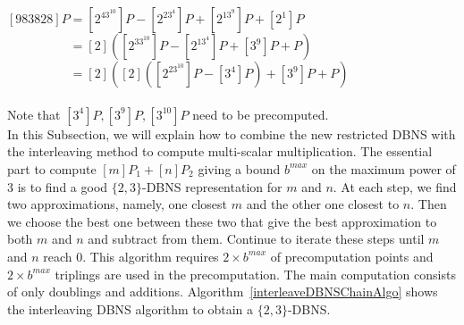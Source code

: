  \\
\\
$[983828]P = [2^43^{10}]P - [2^23^4]P + [2^13^9]P + [2^1]P$ \\
$\phantom{[983828]P} = [2]([2^33^{10}]P - [2^13^4]P + [3^9]P + P)$ \\
$\phantom{[983828]P} = [2]([2]([2^23^{10}]P - [3^4]P) + [3^9]P + P)$ \\
\\
Note that $[3^4]P, [3^9]P, [3^{10}]P$ need to be precomputed. \\

In this Subsection, we will explain how to combine the new restricted DBNS with the interleaving method to compute multi-scalar multiplication.
The essential part to compute $[m]P_1 + [n]P_2$ giving a bound $b^{max}$ on the maximum power of 3
is to find a good $\{2,3\}$-DBNS representation for $m$ and $n$.
At each step, we find two approximations, namely, one closest $m$ and the other one closest to $n$.
Then we choose the best one between these two that give the best approximation to both $m$ and $n$ and subtract from them.
Continue to iterate these steps until $m$ and $n$ reach $0$.
This algorithm requires $2 \times b^{max}$ of precomputation points and $2 \times b^{max}$ triplings are used in the precomputation.
The main computation consists of only doublings and additions.
Algorithm~\ref{interleaveDBNSChainAlgo} shows the interleaving DBNS algorithm to obtain a $\{2,3\}$-DBNS.

